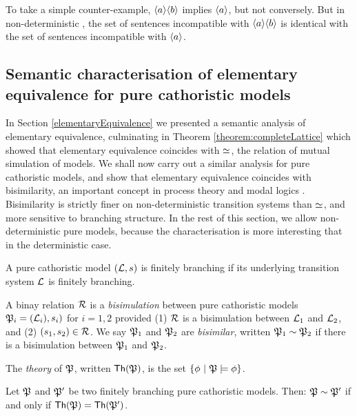 \NI To take a simple counter-example, $\MAY{a}\MAY{b}$ implies $\MAY{a}$,
but not conversely.  But in non-deterministic \cathoristic{}, the set of sentences
incompatible with $\MAY{a}\MAY{b}$ is identical with the set of
sentences incompatible with $\MAY{a}$.

\subsection{Semantic characterisation of elementary equivalence for 
pure cathoristic models}

In Section \ref{elementaryEquivalence} we presented a semantic
analysis of elementary equivalence, culminating in Theorem
\ref{theorem:completeLattice} which showed that elementary equivalence
coincides with $\simeq$, the relation of mutual simulation of
models. We shall now carry out a similar analysis for pure cathoristic
models, and show that elementary equivalence coincides with
bisimilarity, an important concept in process theory and modal logics
\cite{SangiorgiD:intbisac}. Bisimilarity is strictly finer on
non-deterministic transition systems than $\simeq$, and more
sensitive to branching structure.  In the rest of this section, we
allow non-deterministic pure models, because the characterisation is
more interesting that in the deterministic case.

\begin{definition}
A pure cathoristic model $(\mathcal{L}, s)$ is finitely branching if its
underlying transition system $\mathcal{L}$ is finitely branching.
\end{definition}

\begin{definition}
A binay relation $\mathcal{R}$ is a \emph{bisimulation} between pure cathoristic
models $\frak{P}_i = (\mathcal{L}_i), s_i)$ for $i = 1, 2$ provided (1) $\mathcal{R}$ is
a bisimulation between $\mathcal{L}_1$ and $\mathcal{L}_2$, and (2) $(s_1, s_2) \in
\mathcal{R}$. We say $\frak{P}_1$ and $\frak{P}_2$ are \emph{bisimilar}, written
$\frak{P}_1 \sim \frak{P}_2$ if there is a bisimulation between $\frak{P}_1$ and
$\frak{P}_2$.
\end{definition}

\begin{definition}
The \emph{theory} of $\frak{P}$, written $\mathsf{Th}(\frak{P})$, is the set
$\{\phi\ |\ \frak{P} \models \phi\}$.
\end{definition}

\begin{theorem}
\label{hennessymilnertheorem}
Let $\frak{P}$ and $\frak{P}'$ be two finitely branching pure cathoristic
models. Then: $\frak{P} \sim \frak{P}'$ if and only if $\mathsf{Th}(\frak{P}) =
\mathsf{Th}(\frak{P}')$. 
\end{theorem}

